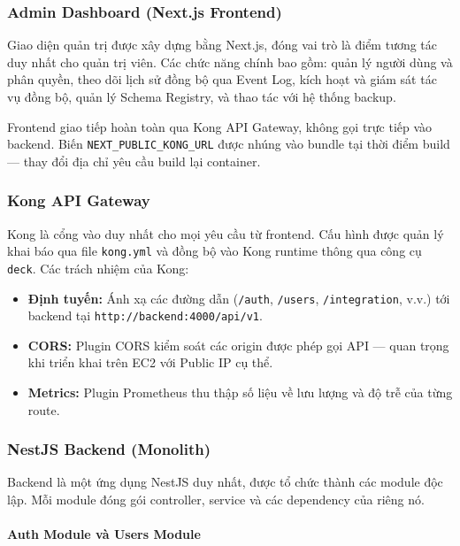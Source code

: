 \subsubsection{Admin Dashboard (Next.js Frontend)}

Giao diện quản trị được xây dựng bằng Next.js, đóng vai trò là điểm
tương tác duy nhất cho quản trị viên. Các chức năng chính bao gồm: quản
lý người dùng và phân quyền, theo dõi lịch sử đồng bộ qua Event Log,
kích hoạt và giám sát tác vụ đồng bộ, quản lý Schema Registry, và thao
tác với hệ thống backup.

Frontend giao tiếp hoàn toàn qua Kong API Gateway, không gọi trực tiếp
vào backend. Biến \texttt{NEXT\_PUBLIC\_KONG\_URL} được nhúng vào bundle
tại thời điểm build — thay đổi địa chỉ yêu cầu build lại container.

\subsubsection{Kong API Gateway}

Kong là cổng vào duy nhất cho mọi yêu cầu từ frontend. Cấu hình được
quản lý khai báo qua file \texttt{kong.yml} và đồng bộ vào Kong runtime
thông qua công cụ \texttt{deck}. Các trách nhiệm của Kong:

\begin{itemize}
    \item \textbf{Định tuyến:} Ánh xạ các đường dẫn
    (\texttt{/auth}, \texttt{/users}, \texttt{/integration}, v.v.) tới
    backend tại \texttt{http://backend:4000/api/v1}.
    \item \textbf{CORS:} Plugin CORS kiểm soát các origin được phép gọi
    API — quan trọng khi triển khai trên EC2 với Public IP cụ thể.
    \item \textbf{Metrics:} Plugin Prometheus thu thập số liệu về lưu
    lượng và độ trễ của từng route.
\end{itemize}

\subsubsection{NestJS Backend (Monolith)}

Backend là một ứng dụng NestJS duy nhất, được tổ chức thành các module
độc lập. Mỗi module đóng gói controller, service và các dependency của
riêng nó.

\paragraph{Auth Module và Users Module}


